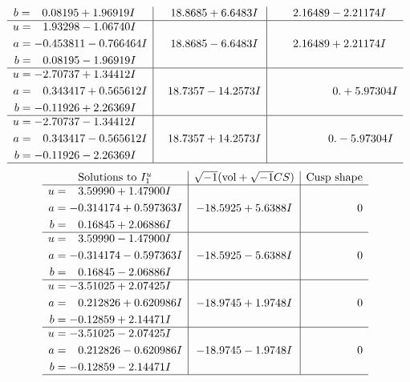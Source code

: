 \documentclass[1p]{elsarticle_modified}
\theoremstyle{definition}
\newcommand{\I}{\sqrt{-1}}
\begin{document}
$$\begin{array}{c|c|c}
\begin{aligned}
b &= \phantom{-}0.08195 + 1.96919 I\end{aligned}
 & \phantom{-}18.8685 + 6.6483 I & \phantom{-}2.16489 - 2.21174 I \\ \hline\begin{aligned}
u &= \phantom{-}1.93298 - 1.06740 I \\
a &= -0.453811 - 0.766464 I \\
b &= \phantom{-}0.08195 - 1.96919 I\end{aligned}
 & \phantom{-}18.8685 - 6.6483 I & \phantom{-}2.16489 + 2.21174 I \\ \hline\begin{aligned}
u &= -2.70737 + 1.34412 I \\
a &= \phantom{-}0.343417 + 0.565612 I \\
b &= -0.11926 + 2.26369 I\end{aligned}
 & \phantom{-}18.7357 - 14.2573 I & \phantom{-0.000000 -}0. + 5.97304 I \\ \hline\begin{aligned}
u &= -2.70737 - 1.34412 I \\
a &= \phantom{-}0.343417 - 0.565612 I \\
b &= -0.11926 - 2.26369 I\end{aligned}
 & \phantom{-}18.7357 + 14.2573 I & \phantom{-0.000000 } 0. - 5.97304 I\\
 \hline 
 \end{array}$$\newpage$$\begin{array}{c|c|c}  
\text{Solutions to }I^u_{1}& \I (\text{vol} + \sqrt{-1}CS) & \text{Cusp shape}\\
 \hline 
\begin{aligned}
u &= \phantom{-}3.59990 + 1.47900 I \\
a &= -0.314174 + 0.597363 I \\
b &= \phantom{-}0.16845 + 2.06886 I\end{aligned}
 & -18.5925 + 5.6388 I & \phantom{-0.000000 } 0 \\ \hline\begin{aligned}
u &= \phantom{-}3.59990 - 1.47900 I \\
a &= -0.314174 - 0.597363 I \\
b &= \phantom{-}0.16845 - 2.06886 I\end{aligned}
 & -18.5925 - 5.6388 I & \phantom{-0.000000 } 0 \\ \hline\begin{aligned}
u &= -3.51025 + 2.07425 I \\
a &= \phantom{-}0.212826 + 0.620986 I \\
b &= -0.12859 + 2.14471 I\end{aligned}
 & -18.9745 + 1.9748 I & \phantom{-0.000000 } 0 \\ \hline\begin{aligned}
u &= -3.51025 - 2.07425 I \\
a &= \phantom{-}0.212826 - 0.620986 I \\
b &= -0.12859 - 2.14471 I\end{aligned}
 & -18.9745 - 1.9748 I & \phantom{-0.000000 } 0\\
 \hline 
 \end{array}$$\newpage\newpage\renewcommand{\arraystretch}{1}
\end{document}

